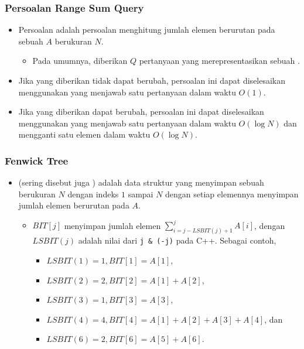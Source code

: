 \begin{frame}
\frametitle{Persoalan Range Sum Query}
\begin{itemize}
  \item Persoalan  adalah persoalan menghitung jumlah elemen berurutan pada sebuah \farray $A$ berukuran $N$.
  \begin{itemize}
    \item Pada umumnya, diberikan $Q$ pertanyaan yang merepresentasikan sebuah \fsubarray.
  \end{itemize}
  \item Jika \farray yang diberikan tidak dapat berubah, persoalan ini dapat diselesaikan menggunakan \fprefixSum yang menjawab satu pertanyaan dalam waktu $O(1)$.
  \item Jika \farray yang diberikan dapat berubah, persoalan ini dapat diselesaikan menggunakan \ffenwickTree yang menjawab satu pertanyaan dalam waktu $O(\log N)$ dan mengganti satu elemen \farray dalam waktu $O(\log N)$.
\end{itemize}
\end{frame}

\begin{frame}
\frametitle{Fenwick Tree}
\begin{itemize}
  \item {} (sering disebut juga ) adalah data struktur yang menyimpan sebuah \farray berukuran $N$ dengan indeks $1$ sampai $N$ dengan setiap elemennya menyimpan jumlah elemen berurutan pada \farray $A$.
  \begin{itemize}
    \item $BIT[j]$ menyimpan jumlah elemen $\sum_{i=j - LSBIT(j) + 1}^{j} A[i]$, dengan $LSBIT(j)$ adalah nilai dari \lstinline{j & (-j)} pada C++. Sebagai contoh,
    \begin{itemize}
      \item $LSBIT(1) = 1, BIT[1] = A[1]$,
      \item $LSBIT(2) = 2, BIT[2] = A[1] + A[2]$,
      \item $LSBIT(3) = 1, BIT[3] = A[3]$,
      \item $LSBIT(4) = 4, BIT[4] = A[1] + A[2] + A[3] + A[4]$, dan
      \item $LSBIT(6) = 2, BIT[6] = A[5] + A[6]$.
    \end{itemize}
  \end{itemize}
\end{itemize}
\end{frame}

